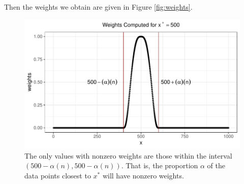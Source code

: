 \documentclass[12pt,twoside]{smiththesis}
\begin{document}
Then the weights we obtain are given in Figure \ref{fig:weights}.
\begin{figure}

{\centering \includegraphics[width=1\linewidth]{thesis_files/figure-latex/unnamed-chunk-33-1} 

}

\caption{\label{fig:weights} The only values with nonzero weights are those within the interval $(500 - \alpha (n), 500 - \alpha (n))$. That is, the proportion $\alpha$ of the data points closest to $x^*$ will have nonzero weights.}\label{fig:unnamed-chunk-33}
\end{figure}
\newpage
\end{document}
